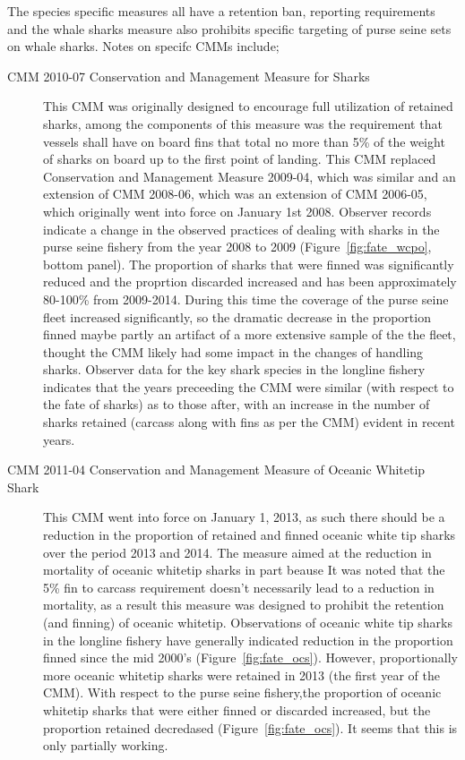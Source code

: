 \documentclass[12pt]{SCreport}
\begin{document}
The species specific measures all have a retention ban, reporting requirements and the whale sharks measure also prohibits specific targeting of purse seine sets on whale sharks.  Notes on specifc CMMs include;

\begin{description}
 \item[CMM 2010-07 Conservation and Management Measure for Sharks] This CMM was originally designed to encourage full utilization of retained sharks, among the components of this measure was the requirement that vessels shall have on board fins that total no more than 5\% of the weight of sharks on board up to the first point of landing. 
This CMM replaced Conservation and Management Measure 2009-04, which was similar and an extension of CMM 2008-06, which was an extension of CMM 2006-05, which originally went into force on January 1st 2008.   
Observer records indicate a   change in the observed practices of dealing with sharks in the purse seine fishery from the year 2008 to 2009 (Figure~\ref{fig:fate_wcpo}, bottom panel). 
The proportion of sharks that were finned was significantly reduced and the proprtion discarded increased and has been approximately 80-100\% from 2009-2014. During this time the coverage of the purse seine fleet increased significantly, so the dramatic decrease in the proportion finned maybe partly an artifact of a more extensive sample of the the fleet, thought the CMM likely had some impact in the changes of handling sharks. 
Observer data for the key shark species in the longline fishery indicates that the years preceeding the CMM were similar (with respect to the fate of sharks) as to those after, with an increase in the number of sharks retained (carcass along with fins as per the CMM) evident in recent years.
 
 
 
 \item[CMM 2011-04 Conservation and Management Measure of Oceanic Whitetip Shark] This CMM went into force on  January 1, 2013, as such there should be a reduction in the proportion of retained and finned oceanic white tip sharks over the period 2013 and 2014. The measure aimed at the reduction in mortality of oceanic whitetip sharks in part beause It   was noted that the 5\% fin to carcass requirement doesn't necessarily lead to a reduction in mortality, as a result this measure was  designed to prohibit the retention (and finning) of oceanic whitetip.
Observations of oceanic white tip sharks in the  longline  fishery have generally indicated reduction in the proportion finned since the mid 2000's (Figure~\ref{fig:fate_ocs}). However, proportionally  more oceanic whitetip sharks were retained in 2013 (the first year of the CMM).  With respect to the purse seine fishery,the proportion of oceanic whitetip sharks that were either finned or discarded increased, but the proportion retained decredased (Figure~\ref{fig:fate_ocs}).  It seems that this is only partially working.


\end{description}
\end{document}
